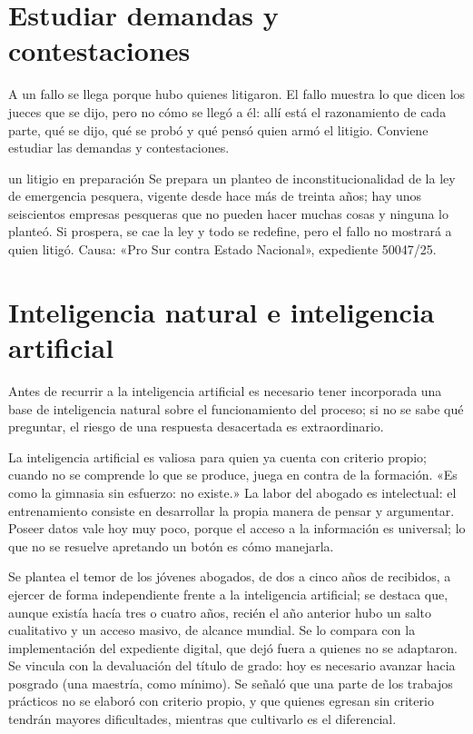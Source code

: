 \documentclass[12pt,oneside]{book}
\begin{document}
\section{Estudiar demandas y contestaciones}

A un fallo se llega porque hubo quienes litigaron. El fallo muestra lo que dicen los jueces que se dijo, pero no cómo se llegó a él: allí está el razonamiento de cada parte, qué se dijo, qué se probó y qué pensó quien armó el litigio. Conviene estudiar las demandas y contestaciones.

\begin{ejemplo}{un litigio en preparación}
Se prepara un planteo de inconstitucionalidad de la ley de emergencia pesquera, vigente desde hace más de treinta años; hay unos seiscientos empresas pesqueras que no pueden hacer muchas cosas y ninguna lo planteó. Si prospera, se cae la ley y todo se redefine, pero el fallo no mostrará a quien litigó. Causa: «Pro Sur contra Estado Nacional», expediente 50047/25.
\end{ejemplo}

\section{Inteligencia natural e inteligencia artificial}

Antes de recurrir a la inteligencia artificial es necesario tener incorporada una base de inteligencia natural sobre el funcionamiento del proceso; si no se sabe qué preguntar, el riesgo de una respuesta desacertada es extraordinario.

\begin{importante}
La inteligencia artificial es valiosa para quien ya cuenta con criterio propio; cuando no se comprende lo que se produce, juega en contra de la formación. «Es como la gimnasia sin esfuerzo: no existe.» La labor del abogado es intelectual: el entrenamiento consiste en desarrollar la propia manera de pensar y argumentar. Poseer datos vale hoy muy poco, porque el acceso a la información es universal; lo que no se resuelve apretando un botón es cómo manejarla.
\end{importante}

Se plantea el temor de los jóvenes abogados, de dos a cinco años de recibidos, a ejercer de forma independiente frente a la inteligencia artificial; se destaca que, aunque existía hacía tres o cuatro años, recién el año anterior hubo un salto cualitativo y un acceso masivo, de alcance mundial. Se lo compara con la implementación del expediente digital, que dejó fuera a quienes no se adaptaron. Se vincula con la devaluación del título de grado: hoy es necesario avanzar hacia posgrado (una maestría, como mínimo). Se señaló que una parte de los trabajos prácticos no se elaboró con criterio propio, y que quienes egresan sin criterio tendrán mayores dificultades, mientras que cultivarlo es el diferencial.
\end{document}
